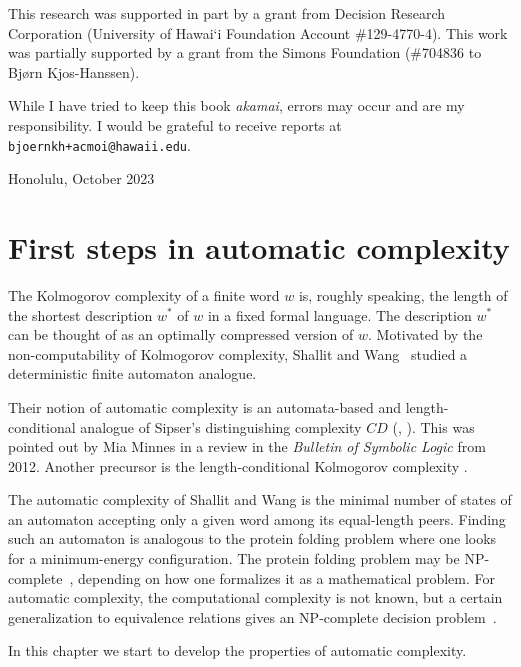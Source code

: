 	This research was supported in part by a grant from Decision Research Corporation
	(University of Hawai\textquoteleft i Foundation Account \#129-4770-4).
	This work was partially supported by a grant from the Simons Foundation (\#704836 to Bj\o rn Kjos-Hanssen).

	While I have tried to keep this book \emph{akamai}, errors may occur and are my responsibility.
	I would be grateful to receive reports at \texttt{bjoernkh+acmoi@hawaii.edu}.

\begin{flushright}	
	Honolulu, October 2023
\end{flushright}


\chapter{First steps in automatic complexity}\label{chap:2001}

The Kolmogorov complexity of a finite word $w$ is, roughly speaking,
	the length of the shortest description $w^*$ of $w$ in a fixed formal language.
	The description $w^*$ can be thought of as an optimally compressed version of $w$.
	Motivated by the non-computability of Kolmogorov complexity,
	Shallit and Wang~\cite{MR1897300} studied a deterministic finite automaton analogue.

	Their notion of automatic complexity is an automata-based and length-conditional analogue of
	Sipser's distinguishing complexity $CD$ (\cite{Sipser:1983:CTA:800061.808762}, \cite[Definition 7.1.4]{MR1438307}).
	This was pointed out by Mia Minnes in a review in the \emph{Bulletin of Symbolic Logic} from 2012.
	Another precursor is the length-conditional Kolmogorov complexity \cite[Definition 2.2.2]{MR1438307}.
	
	The automatic complexity of Shallit and Wang is the minimal number of states of an automaton accepting only a given word among its equal-length peers.
	Finding such an automaton is analogous to the protein folding problem where one looks for a minimum-energy configuration.
	The protein folding problem may be NP-complete~\cite{CGPPY:98}, depending on how one formalizes it as a mathematical problem.
	For automatic complexity, the computational complexity is not known, but a certain generalization to equivalence relations gives an NP-complete decision problem~\cite{MR3712310}.

	In this chapter we start to develop the properties of automatic complexity.
